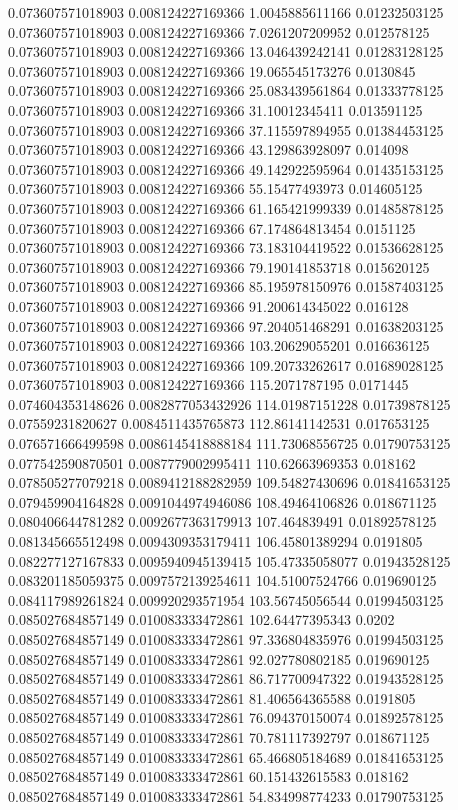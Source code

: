 0.073607571018903 0.008124227169366 1.0045885611166 0.01232503125
0.073607571018903 0.008124227169366 7.0261207209952 0.012578125
0.073607571018903 0.008124227169366 13.046439242141 0.01283128125
0.073607571018903 0.008124227169366 19.065545173276 0.0130845
0.073607571018903 0.008124227169366 25.083439561864 0.01333778125
0.073607571018903 0.008124227169366 31.10012345411 0.013591125
0.073607571018903 0.008124227169366 37.115597894955 0.01384453125
0.073607571018903 0.008124227169366 43.129863928097 0.014098
0.073607571018903 0.008124227169366 49.142922595964 0.01435153125
0.073607571018903 0.008124227169366 55.15477493973 0.014605125
0.073607571018903 0.008124227169366 61.165421999339 0.01485878125
0.073607571018903 0.008124227169366 67.174864813454 0.0151125
0.073607571018903 0.008124227169366 73.183104419522 0.01536628125
0.073607571018903 0.008124227169366 79.190141853718 0.015620125
0.073607571018903 0.008124227169366 85.195978150976 0.01587403125
0.073607571018903 0.008124227169366 91.200614345022 0.016128
0.073607571018903 0.008124227169366 97.204051468291 0.01638203125
0.073607571018903 0.008124227169366 103.20629055201 0.016636125
0.073607571018903 0.008124227169366 109.20733262617 0.01689028125
0.073607571018903 0.008124227169366 115.2071787195 0.0171445
0.074604353148626 0.0082877053432926 114.01987151228 0.01739878125
0.07559231820627 0.0084511435765873 112.86141142531 0.017653125
0.076571666499598 0.0086145418888184 111.73068556725 0.01790753125
0.077542590870501 0.0087779002995411 110.62663969353 0.018162
0.078505277079218 0.0089412188282959 109.54827430696 0.01841653125
0.079459904164828 0.0091044974946086 108.49464106826 0.018671125
0.080406644781282 0.0092677363179913 107.464839491 0.01892578125
0.081345665512498 0.0094309353179411 106.45801389294 0.0191805
0.082277127167833 0.0095940945139415 105.47335058077 0.01943528125
0.083201185059375 0.0097572139254611 104.51007524766 0.019690125
0.084117989261824 0.009920293571954 103.56745056544 0.01994503125
0.085027684857149 0.010083333472861 102.64477395343 0.0202
0.085027684857149 0.010083333472861 97.336804835976 0.01994503125
0.085027684857149 0.010083333472861 92.027780802185 0.019690125
0.085027684857149 0.010083333472861 86.717700947322 0.01943528125
0.085027684857149 0.010083333472861 81.406564365588 0.0191805
0.085027684857149 0.010083333472861 76.094370150074 0.01892578125
0.085027684857149 0.010083333472861 70.781117392797 0.018671125
0.085027684857149 0.010083333472861 65.466805184689 0.01841653125
0.085027684857149 0.010083333472861 60.151432615583 0.018162
0.085027684857149 0.010083333472861 54.834998774233 0.01790753125
